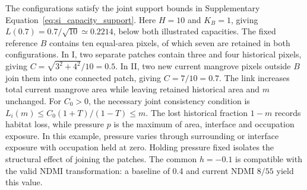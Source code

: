 The configurations satisfy the joint support bounds in Supplementary Equation~\eqref{eq:si_capacity_support}. Here $H=10$ and $K_B=1$, giving $L(0.7)=0.7/\sqrt{10}\simeq0.2214$, below both illustrated capacities. The fixed reference $B$ contains ten equal-area pixels, of which seven are retained in both configurations. In I, two separate patches contain three and four historical pixels, giving $C=\sqrt{3^2+4^2}/10=0.5$. In II, two new current mangrove pixels outside $B$ join them into one connected patch, giving $C=7/10=0.7$. The link increases total current mangrove area while leaving retained historical area and $m$ unchanged. For $C_0>0$, the necessary joint consistency condition is $L_i(m)\leq C_0(1+T)/(1-T)\leq m$. The lost historical fraction $1-m$ records habitat loss, while pressure $p$ is the maximum of area, interface and occupation exposure. In this example, pressure varies through surrounding or interface exposure with occupation held at zero. Holding pressure fixed isolates the structural effect of joining the patches. The common $h=-0.1$ is compatible with the valid NDMI transformation: a baseline of 0.4 and current NDMI $8/55$ yield this value.

